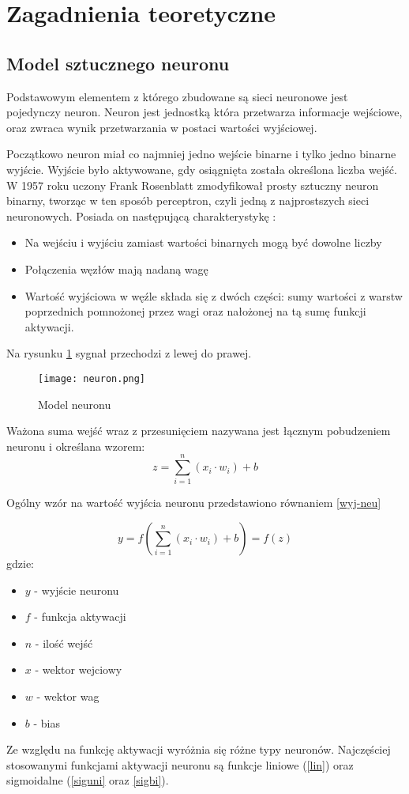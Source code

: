 \documentclass[12pt,twoside]{article}
\begin{document}
\clearpage
\section{Zagadnienia teoretyczne}
\subsection{Model sztucznego neuronu}
Podstawowym elementem z którego zbudowane są sieci neuronowe jest pojedynczy neuron. Neuron jest jednostką która przetwarza informacje wejściowe, oraz zwraca wynik przetwarzania w postaci wartości wyjściowej. 


Początkowo neuron miał co najmniej jedno wejście binarne i tylko jedno binarne wyjście. Wyjście było aktywowane, gdy osiągnięta została określona liczba wejść. W 1957 roku uczony Frank Rosenblatt zmodyfikował prosty sztuczny neuron binarny, tworząc w ten sposób perceptron, czyli jedną z najprostszych sieci neuronowych. Posiada on następującą charakterystykę \cite{mamczur}:
\begin{itemize}
\item Na wejściu i wyjściu zamiast wartości binarnych mogą być dowolne liczby
\item Połączenia węzłów mają nadaną wagę
\item Wartość wyjściowa w węźle składa się z dwóch części: sumy wartości z warstw poprzednich pomnożonej przez wagi oraz nałożonej na tą sumę funkcji aktywacji.
\end{itemize}

Na rysunku \ref{neuron} sygnał przechodzi z lewej do prawej.

\begin{figure}[ht]
\label{neuron}
\centering
\texttt{[image: neuron.png]}
\caption{Model neuronu}
\end{figure}

Ważona suma wejść wraz z przesunięciem nazywana jest łącznym pobudzeniem neuronu i określana wzorem:
\begin{equation}\label{pobudzenie}
z = \sum_{i=1}^{n}(x_i \cdot w_i) + b 
\end{equation}

Ogólny wzór na wartość wyjścia neuronu przedstawiono równaniem \ref{wyj-neu}

\begin{equation}\label{wyj-neu}
y = f \left(  \sum_{i=1}^{n}(x_i \cdot w_i) + b \right) = f(z)
\end{equation}
gdzie:
\begin{itemize}
\item $y$ - wyjście neuronu
\item $f$ - funkcja aktywacji
\item $n$ - ilość wejść
\item $x$ - wektor wejciowy
\item $w$ - wektor wag
\item $b$  - bias
\end{itemize}
Ze względu na funkcję aktywacji wyróżnia się różne typy neuronów. Najczęściej stosowanymi funkcjami aktywacji neuronu są funkcje liniowe (\ref{lin}) oraz sigmoidalne (\ref{siguni} oraz \ref{sigbi}).
\end{document}
